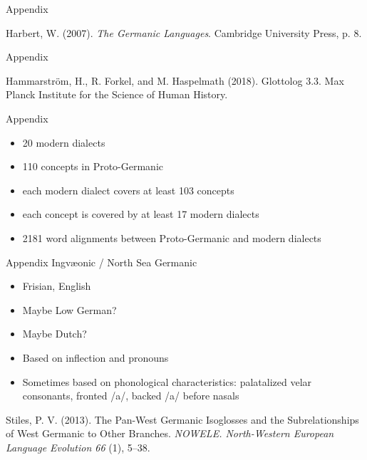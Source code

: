 \documentclass[xcolor={dvipsnames}]{beamer}
\begin{document}
\begin{frame}{Appendix}
\begin{figure}
\centering

\end{figure}
\vspace{1em}
Harbert, W. (2007). \textit{The Germanic Languages}. Cambridge University Press, p. 8.
\end{frame}

\begin{frame}{Appendix}
\vspace*{-1cm}\begin{figure}
\begin{adjustwidth}{-10cm}{-10cm}
\centering
\scalebox{0.45}{

}
\end{adjustwidth}
\end{figure}
Hammarström, H., R. Forkel, and M. Haspelmath (2018). Glottolog 3.3. Max
Planck Institute for the Science of Human History.
\end{frame}

\begin{frame}{Appendix}
\begin{itemize}
    \item 20 modern dialects
    \item 110 concepts in Proto-Germanic
    \item each modern dialect covers at least 103 concepts
    \item each concept is covered by at least 17 modern dialects
    \item 2181 word alignments between Proto-Germanic and modern dialects
\end{itemize}
\end{frame}

\begin{frame}{Appendix}
Ingv\ae{}onic / North Sea Germanic
\begin{itemize}
    \item Frisian, English
    \item Maybe Low German?
    \item Maybe Dutch?
    \vspace{2em}
    \item Based on inflection and pronouns
    \item Sometimes based on phonological characteristics: palatalized velar consonants, fronted /a/, backed /a/ before nasals
\end{itemize}
\vspace{2em}
Stiles, P. V. (2013). The Pan-West Germanic Isoglosses and the Subrelationships
of West Germanic to Other Branches. \textit{NOWELE. North-Western European
Language Evolution 66} (1), 5–38.
\end{frame}
\end{document}
